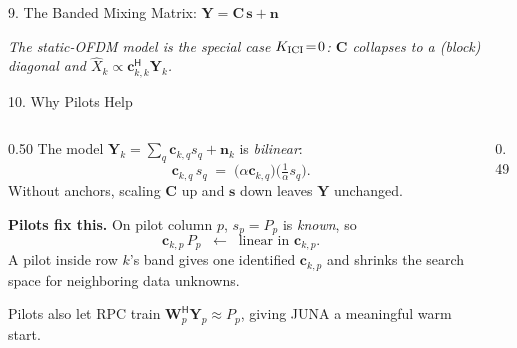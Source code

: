 \documentclass[aspectratio=169,10pt]{beamer}
\newcommand{\vY}{\bm{Y}}
\newcommand{\vc}{\bm{c}}
\newcommand{\vn}{\bm{n}}
\newcommand{\vW}{\bm{W}}
\newcommand{\vC}{\bm{C}}
\newcommand{\vs}{\bm{s}}
\newcommand{\hX}{\hat{X}}
\newcommand{\herm}{\mathsf{H}}
\begin{document}
\begin{frame}{9. The Banded Mixing Matrix: $\vY=\vC\,\vs+\vn$}
  \vspace{-0.1em}
  \begin{center}
    {\itshape\small The static-OFDM model is the special case $K_{\rm ICI}\!=\!0$:
    $\vC$ collapses to a (block) diagonal and $\hX_k\!\propto\!\vc_{k,k}^{\herm}\vY_k$.}
  \end{center}
\end{frame}

\begin{frame}{10. Why Pilots Help}

  \begin{columns}[T,onlytextwidth]
    \begin{column}{0.50\textwidth}
      The model $\vY_k=\sum_q\vc_{k,q}s_q+\vn_k$ is \emph{bilinear}:
      \[
        \vc_{k,q}\,s_q
        \;=\;
        \big(\alpha\vc_{k,q}\big)\big(\tfrac{1}{\alpha}s_q\big).
      \]
      Without anchors, scaling $\vC$ up and $\vs$ down leaves $\vY$ unchanged.

      \vspace{0.3em}
      \textbf{Pilots fix this.} On pilot column $p$, $s_p\!=\!P_p$ is \emph{known}, so
      \[
        \vc_{k,p}\,P_p \;\;\longleftarrow\;\; \text{linear in }\vc_{k,p}.
      \]
      A pilot inside row $k$'s band gives one identified $\vc_{k,p}$ and shrinks the search space for neighboring data unknowns.

      \vspace{0.2em}
      Pilots also let RPC train $\vW_p^{\herm}\vY_p\!\approx\!P_p$, giving JUNA a meaningful warm start.
    \end{column}

    \begin{column}{0.49\textwidth}
      \begin{center}
\end{center}
\end{column}
\end{columns}
\end{frame}
\end{document}
